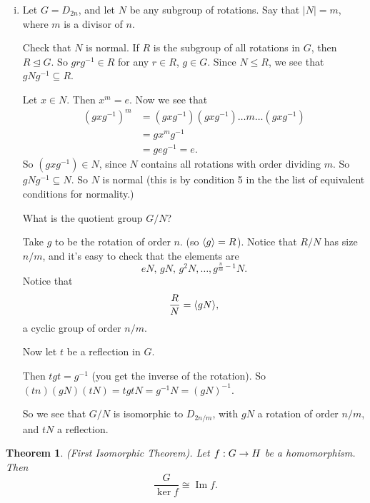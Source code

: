 \documentclass{article}
\newtheorem{theorem}{Theorem}
\theoremstyle{definition} \newtheorem*{definition}{Definition}
\newcommand{\ism}{\cong} \newcommand{\elemt}[2]{#1_{{#2}\sigma(#2)}}
\DeclareMathOperator{\Ima}{Im} \DeclareMathOperator{\Sym}{Sym}
\begin{document}
\begin{exmps}
\begin{enumerate}[(i)]
     \item Let $G=D_{2n}$, and let $N$ be any subgroup of rotations. Say that
       $|N|=m$, where $m$ is a divisor of $n$.

       Check that $N$ is normal. If $R$ is the subgroup of all rotations in
       $G$, then $R \trianglelefteq G$. So $g r g^{-1} \in R$ for any $r \in
       R$, $g \in G$. Since $N \leq R$, we see that $g N g^{-1} \subseteq R$.

       Let $x \in N$. Then $x^m = e$. Now we see that \begin{align*} \left(
         gxg^{-1} \right)^m &= (gxg^{-1})(gxg^{-1})\dots m \dots(gxg^{-1})\\ &=
         gx^mg^{-1}\\ &= geg^{-1} = e.  \end{align*} So $(gxg^{-1})\in N$,
       since $N$ contains all rotations with order dividing $m$. So
       $gNg^{-1}\subseteq N$. So $N$ is normal (this is by condition 5 in the
       the list of equivalent conditions for normality.)

       What is the quotient group $G/N$?

       Take $g$ to be the rotation of order $n$. (so $\langle g \rangle=R$). Notice that
       $R/N$ has size $n/m$, and it's easy to check that the elements are \[
       eN,\,gN,\,g^{2}N,\dots,g^{\frac{n}{m} - 1}N.  \] Notice that \[
       \frac{R}{N}=\langle gN \rangle, \] a cyclic group of order $n/m$. 

       Now let $t$ be a reflection in $G$.

       Then $tgt=g^{-1}$ (you get the inverse of the rotation). So
       $(tn)(gN)(tN)=tgtN=g^{-1}N=(gN)^{-1}$.

       So we see that $G/N$ is isomorphic to $D_{2n/m}$, with $gN$ a rotation
       of order $n/m$, and $tN$ a reflection.  \end{enumerate} \end{exmps}

  \begin{theorem} (First Isomorphic Theorem). Let $f : G \rightarrow H$ be a
    homomorphism. Then \[ \frac{G}{\ker f} \ism \Ima f.  \]
    \label{thm:firstisomorphic} \end{theorem}
\end{document}
